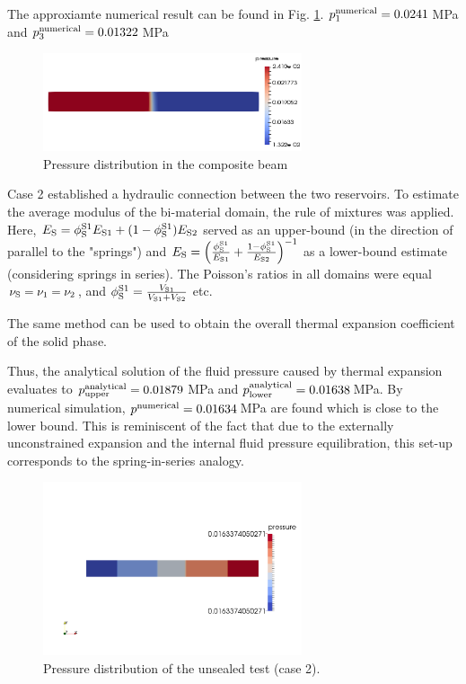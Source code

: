 \documentclass[a4paper,10pt]{article}
\begin{document}
The approxiamte numerical result can be found in Fig. \ref{fig:hete_pressure}. $p_1^\mathrm{numerical} = 0.0241$\,MPa and $p_3^\mathrm{numerical} = 0.01322$\,MPa 
\begin{figure}
	\centering
		\includegraphics*[width=3in]{figures/THM_hete_pressure.png}
	\caption{Pressure distribution in the composite beam}
	\label{fig:hete_pressure}
\end{figure} 

Case 2 established a hydraulic connection between the two reservoirs. To estimate the average modulus of the bi-material domain, the rule of mixtures was applied. 
Here, $E_\mathrm{S} = \phi_\mathrm{S}^\mathrm{S1} {E_\mathrm{S1}} + (1 - \phi_\mathrm{S}^\mathrm{S1}) {E_\mathrm{S2}}$ served as an upper-bound (in the direction of parallel to the "springs") and $E_\mathrm{S} = \left( \frac{\phi_\mathrm{S}^\mathrm{S1}}{E_\mathrm{S1}} + \frac{1 - \phi_\mathrm{S}^\mathrm{S1}}{E_\mathrm{S2}} \right)^{-1}$ as a lower-bound estimate (considering springs in series). The Poisson's ratios in all domains were equal $\nu_\mathrm{S} = \nu_1 = \nu_2$, and $\phi_\mathrm{S}^\mathrm{S1} = \frac{V_\mathrm{S1}}{V_\mathrm{S1} + V_\mathrm{S2}}$ etc.

The same method can be used to obtain the overall thermal expansion coefficient of the solid phase.

Thus, the analytical solution of the fluid pressure caused by thermal expansion evaluates to $p_\mathrm{upper}^\mathrm{analytical} = 0.01879$\,MPa and $p_\mathrm{lower}^\mathrm{analytical} = 0.01638$\,MPa. By numerical simulation, $p^\mathrm{numerical} = 0.01634$\,MPa are found which is close to the lower bound. This is reminiscent of the fact that due to the externally unconstrained expansion and the internal fluid pressure equilibration, this set-up corresponds to the spring-in-series analogy.

\begin{figure}
	\centering
		\includegraphics*[width=3in, keepaspectratio=false]{figures/cbeam_pus.png}
	\caption{Pressure distribution of the unsealed test (case 2).}
	\label{fig:bpus}
\end{figure} 
\end{document}
